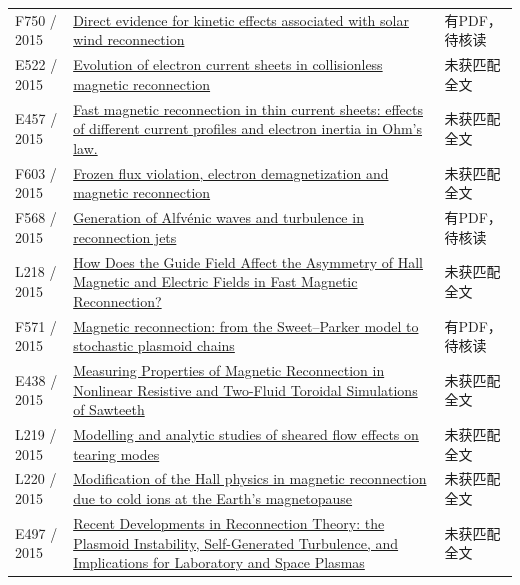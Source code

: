\begin{longtable}{P{24mm}P{97mm}P{27mm}}
F750 / 2015 & \href{https://doi.org/10.1038/srep08080}{Direct evidence for kinetic effects associated with solar wind reconnection} & 有PDF，待核读\\

E522 / 2015 & \href{https://doi.org/10.1063/1.4933120}{Evolution of electron current sheets in collisionless magnetic reconnection} & 未获匹配全文\\

E457 / 2015 & \href{http://ui.adsabs.harvard.edu/abs/2015EGUGA..17.7964P/abstract}{Fast magnetic reconnection in thin current sheets: effects of different current profiles and electron inertia in Ohm's law.} & 未获匹配全文\\

F603 / 2015 & \href{https://doi.org/10.1063/1.4932332}{Frozen flux violation,  electron demagnetization and magnetic reconnection} & 未获匹配全文\\

F568 / 2015 & \href{https://doi.org/10.1002/2014ja020520}{Generation of Alfvénic waves and turbulence in reconnection jets} & 有PDF，待核读\\

L218 / 2015 & \href{https://doi.org/10.1088/0256-307x/32/9/095202}{How Does the Guide Field Affect the Asymmetry of Hall Magnetic and Electric Fields in Fast Magnetic Reconnection?} & 未获匹配全文\\

F571 / 2015 & \href{https://doi.org/10.1088/0741-3335/58/1/014021}{Magnetic reconnection: from the Sweet–Parker model to stochastic plasmoid chains} & 有PDF，待核读\\

E438 / 2015 & \href{http://absimage.aps.org/image/DPP15/MWS_DPP15-2015-001543.pdf}{Measuring Properties of Magnetic Reconnection in Nonlinear Resistive and Two-Fluid Toroidal Simulations of Sawteeth} & 未获匹配全文\\

L219 / 2015 & \href{https://doi.org/10.1088/0029-5515/55/5/053016}{Modelling and analytic studies of sheared flow effects on tearing modes} & 未获匹配全文\\

L220 / 2015 & \href{https://doi.org/10.1002/2015gl065129}{Modification of the Hall physics in magnetic reconnection due to cold ions at the Earth's magnetopause} & 未获匹配全文\\

E497 / 2015 & \href{http://absimage.aps.org/image/DPP15/MWS_DPP15-2015-001927.pdf}{Recent Developments in Reconnection Theory: the Plasmoid Instability,  Self-Generated Turbulence,  and Implications for Laboratory and Space Plasmas} & 未获匹配全文\\


\end{longtable}
